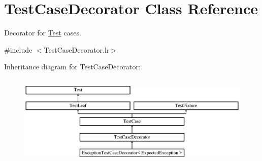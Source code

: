 \hypertarget{class_test_case_decorator}{\section{Test\-Case\-Decorator Class Reference}
\label{class_test_case_decorator}
}


Decorator for \hyperlink{class_test}{Test} cases.  




{\ttfamily \#include $<$Test\-Case\-Decorator.\-h$>$}

Inheritance diagram for Test\-Case\-Decorator\-:\begin{figure}[H]
\begin{center}
\leavevmode
\includegraphics[height=4.444445cm]{class_test_case_decorator}
\end{center}
\end{figure}
